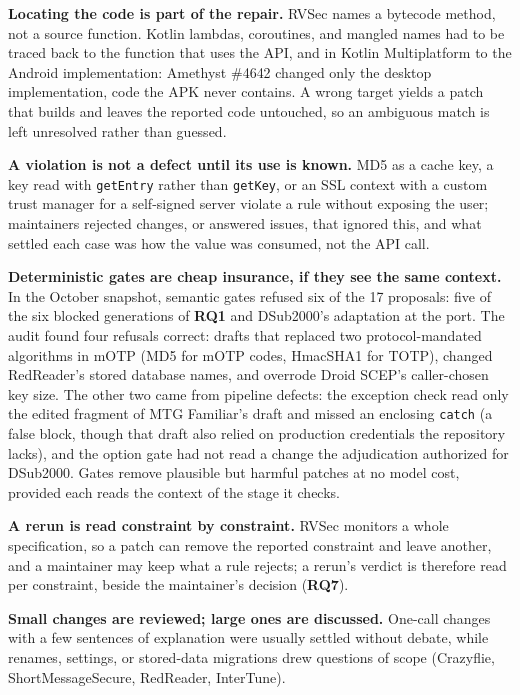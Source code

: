 \documentclass[conference]{IEEEtran}
\newcommand{\researchq}[1]{\textbf{RQ#1}}
\begin{document}
\textbf{Locating the code is part of the repair.} RVSec names a bytecode
method, not a source function. Kotlin lambdas, coroutines, and mangled names
had to be traced back to the function that uses the API, and in Kotlin
Multiplatform to the Android implementation: Amethyst \#4642 changed only the
desktop implementation, code the APK never contains. A wrong target yields a
patch that builds and leaves the reported code untouched, so an ambiguous
match is left unresolved rather than guessed.

\textbf{A violation is not a defect until its use is known.} MD5 as a cache
key, a key read with \texttt{getEntry} rather than \texttt{getKey}, or an SSL
context with a custom trust manager for a self-signed server violate a rule
without exposing the user; maintainers rejected changes, or answered issues,
that ignored this, and what settled each case was
how the value was consumed, not the API call.

\textbf{Deterministic gates are cheap insurance, if they see the same context.}
In the October snapshot, semantic gates refused six of the 17 proposals: five
of the six blocked generations of \researchq{1} and DSub2000's adaptation at the
port. The audit found four refusals correct: drafts that replaced two
protocol-mandated algorithms in mOTP (MD5 for mOTP codes, HmacSHA1 for
TOTP), changed RedReader's stored database names, and overrode
Droid SCEP's caller-chosen key size. The other two came from pipeline defects:
the exception check read only the edited fragment of MTG Familiar's draft and
missed an enclosing \texttt{catch} (a false block, though that draft also relied
on production credentials the repository lacks), and the option gate had not read a change the
adjudication authorized for DSub2000.
Gates remove plausible but harmful patches at no model cost, provided each
reads the context of the stage it checks.

\textbf{A rerun is read constraint by constraint.} RVSec monitors a whole
specification, so a patch can remove the reported constraint and leave
another, and a maintainer may keep what a rule rejects; a rerun's verdict is
therefore read per constraint, beside the maintainer's decision
(\researchq{7}).

\textbf{Small changes are reviewed; large ones are discussed.} One-call
changes with a few sentences of explanation were usually settled without
debate, while renames, settings, or stored-data migrations drew questions of
scope (Crazyflie, ShortMessageSecure, RedReader, InterTune).
\end{document}
